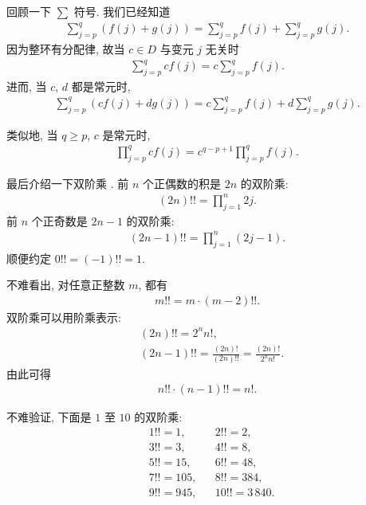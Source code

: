 \begin{remark}
    回顾一下 $\sum$ 符号. 我们已经知道
    \begin{align*}
        \sum_{j=p}^{q} (f(j) + g(j)) = \sum_{j=p}^{q} f(j) + \sum_{j=p}^{q} g(j).
    \end{align*}
    因为整环有分配律, 故当 $c \in D$ 与变元 $j$ 无关时
    \begin{align*}
        \sum_{j=p}^{q} cf(j) = c\sum_{j=p}^{q} f(j).
    \end{align*}
    进而, 当 $c$, $d$ 都是常元时,
    \begin{align*}
        \sum_{j=p}^{q} (cf(j) + dg(j)) = c\sum_{j=p}^{q} f(j) + d\sum_{j=p}^{q} g(j).
    \end{align*}

    类似地, 当 $q \geq p$, $c$ 是常元时,
    \begin{align*}
        \prod_{j=p}^{q} cf(j) = c^{q-p+1} \prod_{j=p}^{q} f(j).
    \end{align*}
\end{remark}

\begin{definition}
    最后介绍一下双阶乘 . 前 $n$ 个正偶数的积是 $2n$ 的双阶乘:
    \begin{align*}
        (2n)!! = \prod_{j=1}^{n} {2j}.
    \end{align*}
    前 $n$ 个正奇数是 $2n-1$ 的双阶乘:
    \begin{align*}
        (2n-1)!! = \prod_{j=1}^{n} {(2j-1)}.
    \end{align*}
    顺便约定 $0!! = (-1)!! = 1$.
\end{definition}

\begin{remark}
    不难看出, 对任意正整数 $m$, 都有
    \begin{align*}
        m!! = m \cdot (m-2)!!.
    \end{align*}
    双阶乘可以用阶乘表示:
    \begin{align*}
         & (2n)!! = 2^n n!,                                        \\
         & (2n-1)!! = \frac{(2n)!}{(2n)!!} = \frac{(2n)!}{2^n n!}.
    \end{align*}
    由此可得
    \begin{align*}
        n!! \cdot (n-1)!! = n!.
    \end{align*}
\end{remark}

\begin{example}
    不难验证, 下面是 $1$ 至 $10$ 的双阶乘:
    \begin{align*}
         & 1!! = 1,   &  & 2!! = 2,       \\
         & 3!! = 3,   &  & 4!! = 8,       \\
         & 5!! = 15,  &  & 6!! = 48,      \\
         & 7!! = 105, &  & 8!! = 384,     \\
         & 9!! = 945, &  & 10!! = 3\,840.
    \end{align*}
\end{example}

